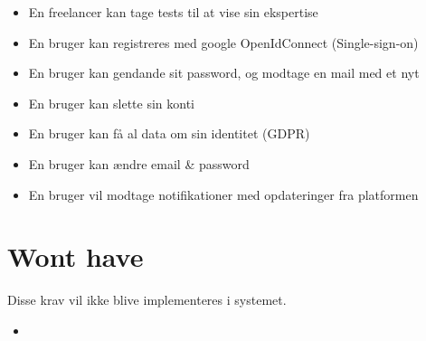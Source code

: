 \begin{itemize}
    \item En freelancer kan tage tests til at vise sin ekspertise
    \item En bruger kan registreres med google OpenIdConnect (Single-sign-on)
    \item En bruger kan gendande sit password, og modtage en mail med et nyt
    \item En bruger kan slette sin konti
    \item En bruger kan få al data om sin identitet (GDPR)
    \item En bruger kan ændre email \& password
    \item En bruger vil modtage notifikationer med opdateringer fra platformen
\end{itemize}

\section{Wont have}

Disse krav vil ikke blive implementeres i systemet.

\begin{itemize}
    \item
\end{itemize}

